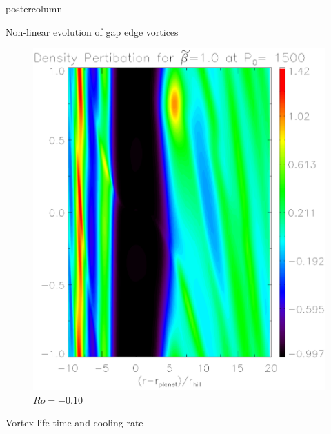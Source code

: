 \documentclass[final,hyperref={pdfpagelabels=false}]{beamer}
\begin{document}
\begin{frame}
\begin{columns}
\begin{column}{.49\textwidth}
\begin{beamercolorbox}[center,wd=\textwidth]{postercolumn}
\begin{minipage}[T]{.95\textwidth}
{\begin{block}{\Large{Non-linear evolution of gap edge
                  vortices}}
\begin{figure}
\begin{minipage}{0.3\textwidth}
                      \includegraphics[width=\textwidth]{Posterfig_After}
                      \caption{$Ro=-0.10$}
                    \end{minipage}
                    \hfill
                  \end{figure}

            \end{block}


            \begin{block}{\Large{Vortex life-time and cooling rate}}
              \justifying


\end{block}}
\end{minipage}
\end{beamercolorbox}
\end{column}
\end{columns}
\end{frame}
\end{document}
